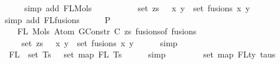 \begin{isabellebody}
\ \ \ \ \isamarkupfalse%
\ {\isacharparenleft}{\kern0pt}simp\ add{\isacharcolon}{\kern0pt}\ FL{\isacharunderscore}{\kern0pt}Mols{}{\isacharparenright}{\kern0pt}\isanewline
\ \ \isamarkupfalse%
\ \isamarkupfalse%
\isanewline
\ \ \ \ {\isachardoublequoteopen}{\isachardot}{\kern0pt}{\isachardot}{\kern0pt}{\isachardot}{\kern0pt}\ {\isacharequal}{\kern0pt}\ set\ zs\ {\isasymunion}\ {\isacharparenleft}{\kern0pt}{\isasymUnion}\ {\isacharparenleft}{\kern0pt}x{\isacharcomma}{\kern0pt}\ y{\isacharparenright}{\kern0pt}\ {\isasymin}\ set\ fusions{\isachardot}{\kern0pt}\ {\isacharbraceleft}{\kern0pt}x{\isacharcomma}{\kern0pt}\ y{\isacharbraceright}{\kern0pt}{\isacharparenright}{\kern0pt}{\isachardoublequoteclose}\isanewline
\ \ \ \ \isamarkupfalse%
\ {\isacharparenleft}{\kern0pt}simp\ add{\isacharcolon}{\kern0pt}\ FL{\isacharunderscore}{\kern0pt}fusions{\isacharparenright}{\kern0pt}\isanewline
\ \ \isamarkupfalse%
\ \isamarkupfalse%
\ P{}{}{\isacharcolon}{\kern0pt}\isanewline
\ \ \ \ {\isachardoublequoteopen}FL\ {\isacharparenleft}{\kern0pt}Mols{}\ {\isacharparenleft}{\kern0pt}Atom\ {\isacharparenleft}{\kern0pt}GConstr\ C{\isacharparenright}{\kern0pt}\ zs{\isacharparenright}{\kern0pt}\ {\isacharparenleft}{\kern0pt}fusions{\isacharunderscore}{\kern0pt}of\ fusions{\isacharparenright}{\kern0pt}{\isacharparenright}{\kern0pt}\ {\isacharequal}{\kern0pt}\isanewline
\ \ \ \ \ set\ zs\ {\isasymunion}\ {\isacharparenleft}{\kern0pt}{\isasymUnion}\ {\isacharparenleft}{\kern0pt}x{\isacharcomma}{\kern0pt}\ y{\isacharparenright}{\kern0pt}\ {\isasymin}\ set\ fusions{\isachardot}{\kern0pt}\ {\isacharbraceleft}{\kern0pt}x{\isacharcomma}{\kern0pt}\ y{\isacharbraceright}{\kern0pt}{\isacharparenright}{\kern0pt}{\isachardoublequoteclose}\isanewline
\ \ \ \ \isamarkupfalse%
\ simp\isanewline
\isanewline
\ \ \isamarkupfalse%
\ {\isachardoublequoteopen}{\isasymUnion}\ {\isacharparenleft}{\kern0pt}FL\ {\isacharbackquote}{\kern0pt}\ set\ Ts{\isacharparenright}{\kern0pt}\ {\isacharequal}{\kern0pt}\ {\isasymUnion}\ {\isacharparenleft}{\kern0pt}set\ {\isacharparenleft}{\kern0pt}map\ FL\ Ts{\isacharparenright}{\kern0pt}{\isacharparenright}{\kern0pt}{\isachardoublequoteclose}\isanewline
\ \ \ \ \isamarkupfalse%
\ simp\isanewline
\ \ \isamarkupfalse%
\ \isamarkupfalse%
\ {\isachardoublequoteopen}{\isachardot}{\kern0pt}{\isachardot}{\kern0pt}{\isachardot}{\kern0pt}\ {\isacharequal}{\kern0pt}\ {\isasymUnion}\ {\isacharparenleft}{\kern0pt}set\ {\isacharparenleft}{\kern0pt}map\ FLty\ taus{\isacharparenright}{\kern0pt}{\isacharparenright}{\kern0pt}{\isachardoublequoteclose}\isanewline

\end{isabellebody}
